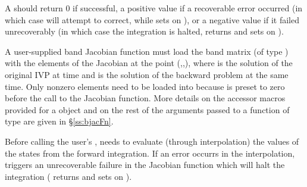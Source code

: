 {
  A  should return 0 if successful, a positive value if a recoverable
  error occurred (in which case {\idas} will attempt to correct, while {\idaband} sets
   on ), or a negative 
  value if it failed unrecoverably (in which case the integration is halted, 
  returns  and {\idadense} sets  on 
  ).
}
{
  A user-supplied band Jacobian function must load the band matrix 
  (of type ) with the elements of the Jacobian at the
  point (,,), where  is the solution
  of the original IVP at time  and  is the solution of the
  backward problem at the same time.  
  Only nonzero elements need to be loaded into
   because  is preset to zero before the call to the
  Jacobian function. More details on the accessor macros provided for
  a  object and on the rest of the arguments passed to a function
  of type  are given in \S\ref{ss:bjacFn}.

  {\warn}Before calling the user's , {\idaa} needs to evaluate
  (through interpolation) the values of the states from the forward integration. 
  If an error occurrs in the interpolation, {\idaa} triggers an unrecoverable
  failure in the Jacobian function which will halt the integration
  ( returns  and {\idaband} sets  on 
  ).
}


